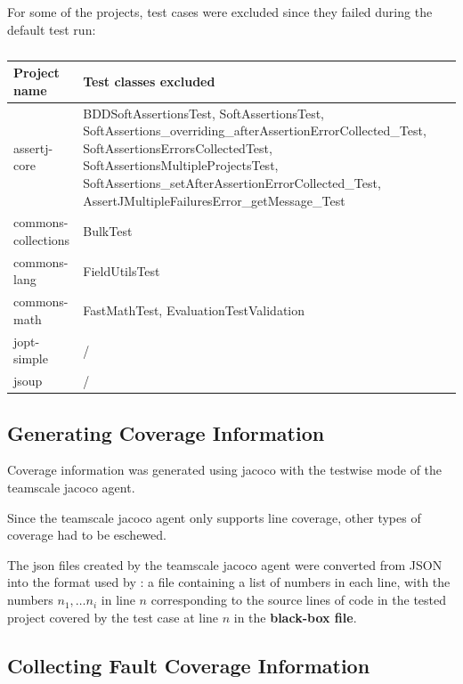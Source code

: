 For some of the projects, test cases were excluded since they failed
during the default test run:


\begin{table}[htpb]
	\caption[]{}\label{tab:excluded} %
	\centering
	\begin{tabular}{l | p{10cm}}
		\toprule
		Project name & Test classes excluded \\
		\midrule
		assertj-core & BDDSoftAssertionsTest, SoftAssertionsTest, SoftAssertions\_overriding\_afterAssertionErrorCollected\_Test, SoftAssertionsErrorsCollectedTest, SoftAssertionsMultipleProjectsTest, SoftAssertions\_setAfterAssertionErrorCollected\_Test, AssertJMultipleFailuresError\_getMessage\_Test \\
		commons-collections & BulkTest \\
		commons-lang & FieldUtilsTest \\
		commons-math & FastMathTest, EvaluationTestValidation \\
		jopt-simple & / \\
		jsoup & / \\
		\bottomrule
	\end{tabular}
\end{table}

\subsection{Generating Coverage Information}

Coverage information was generated using jacoco with the testwise mode
of the teamscale jacoco agent. %

Since the teamscale jacoco agent only supports line coverage, other
types of coverage had to be eschewed.


The json files created by the teamscale jacoco agent were converted
from JSON into the format used by \cite{cruciani2019scalable}: a file
containing a list of numbers in each line, with the numbers $n_1, \dots
n_i$ in line $n$ corresponding to the source lines of code in the tested
project covered by the test case at line $n$ in the \textbf{black-box
file}.

\subsection{Collecting Fault Coverage Information}

